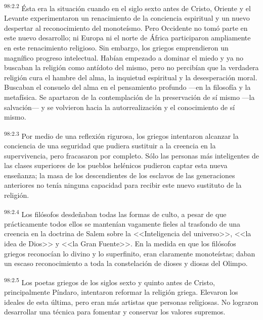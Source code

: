 \par
\textsuperscript{98:2.2} Ésta era la situación cuando en el siglo sexto antes de Cristo, Oriente y el Levante experimentaron un renacimiento de la conciencia espiritual y un nuevo despertar al reconocimiento del monoteísmo. Pero Occidente no tomó parte en este nuevo desarrollo; ni Europa ni el norte de África participaron ampliamente en este renacimiento religioso. Sin embargo, los griegos emprendieron un magnífico progreso intelectual. Habían empezado a dominar el miedo y ya no buscaban la religión como antídoto del mismo, pero no percibían que la verdadera religión cura el hambre del alma, la inquietud espiritual y la desesperación moral. Buscaban el consuelo del alma en el pensamiento profundo ---en la filosofía y la metafísica. Se apartaron de la contemplación de la preservación de sí mismo ---la salvación--- y se volvieron hacia la autorrealización y el conocimiento de sí mismo.

\par
\textsuperscript{98:2.3} Por medio de una reflexión rigurosa, los griegos intentaron alcanzar la conciencia de una seguridad que pudiera sustituir a la creencia en la supervivencia, pero fracasaron por completo. Sólo las personas más inteligentes de las clases superiores de los pueblos helénicos pudieron captar esta nueva enseñanza; la masa de los descendientes de los esclavos de las generaciones anteriores no tenía ninguna capacidad para recibir este nuevo sustituto de la religión.

\par
\textsuperscript{98:2.4} Los filósofos desdeñaban todas las formas de culto, a pesar de que prácticamente todos ellos se mantenían vagamente fieles al trasfondo de una creencia en la doctrina de Salem sobre la <<Inteligencia del universo>>, <<la idea de Dios>> y <<la Gran Fuente>>. En la medida en que los filósofos griegos reconocían lo divino y lo superfinito, eran claramente monoteístas; daban un escaso reconocimiento a toda la constelación de dioses y diosas del Olimpo.

\par
\textsuperscript{98:2.5} Los poetas griegos de los siglos sexto y quinto antes de Cristo, principalmente Píndaro, intentaron reformar la religión griega. Elevaron los ideales de esta última, pero eran más artistas que personas religiosas. No lograron desarrollar una técnica para fomentar y conservar los valores supremos.

